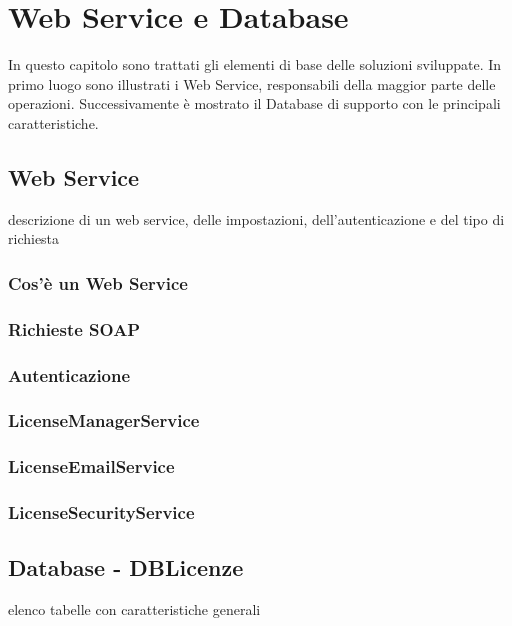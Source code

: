 
\chapter{Web Service e Database}
\label{cap:sviluppo-software}

In questo capitolo sono trattati gli elementi di base delle soluzioni sviluppate. In primo luogo sono illustrati i Web Service, responsabili della maggior parte delle operazioni. Successivamente è mostrato il Database di supporto con le principali caratteristiche.


\section{Web Service}

descrizione di un web service, delle impostazioni, dell'autenticazione e del tipo di richiesta
\subsection{Cos'è un Web Service}

\subsection{Richieste SOAP}

\subsection{Autenticazione}

\subsection{LicenseManagerService}

\subsection{LicenseEmailService}

\subsection{LicenseSecurityService}


\section{Database - DBLicenze}
\label{sez:DBLic}
elenco tabelle con caratteristiche generali
